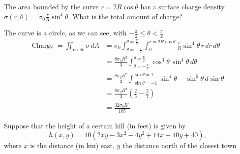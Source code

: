 \documentclass[../main.tex]{subfiles}
\begin{document}
\begin{questions}
\question The area bounded by the curve $r=2R\cos\theta$ has a surface charge density $\sigma(r,\theta)=\sigma_0\frac{r}{R}\sin^4\theta$. What is the total amount of charge?
\begin{solution}
	\begin{center}
	\end{center}
	The curve is a circle, as we can see, with $-\frac{\pi}{2} \leq \theta < \frac{\pi}{2}$
	\begin{align}
		\text{Charge } = \iint_{\text{circle}}\sigma\,dA &= \sigma_0\int^{\theta=\frac{\pi}{2}}_{\theta=-\frac{\pi}{2}}\int^{r=2R\cos\theta}_{0} \frac{r}{R}\sin^4\theta\,r\,dr\,d\theta \\
		&=\frac{8\sigma_0R^2}{3}\int^{\theta=\frac{\pi}{2}}_{\theta=-\frac{\pi}{2}}\cos^3\theta\,\sin^4\theta\,d\theta\\
		&=\frac{8\sigma_0R^2}{3}\int^{\sin\theta=1}_{\sin\theta=-1}\sin^4\theta-\sin^6\theta\,d\sin\theta \\
		&=\frac{8\sigma_0R^2}{3}(\frac{2}{5}-\frac{2}{7}) \\
		&=\frac{32\sigma_0R^2}{105}
	\end{align}
\end{solution}

\question Suppose that the height of a certain hill (in feet) is given by
\begin{equation*}
	h(x,y) = 10(2xy - 3x^2 - 4y^2 + 14x + 10y + 40),
\end{equation*}
where $x$ is the distance (in km) east, $y$ the distance north of the closest town
\begin{parts}

\end{parts}
\end{questions}
\end{document}
